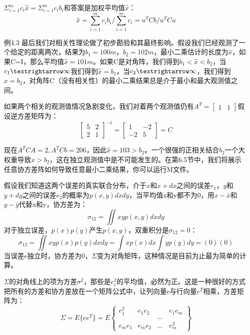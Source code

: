 	$\Sigma^{m}_{i=1}c_i\hat{x}=\Sigma^{m}_{i=1}c_ib_i$和答案是加权平均值$\hat{x}$：
	\begin{equation}
	\hat{x}=\sum_{i=1}^{m}c_ib_i / \sum_{i=1}^{m}c_i=u^TCb/u^TCu
	\end{equation}
	
	例4.3 \quad 最后我们对相关性理论做了初步勘验和其最终影响。假设我们已经观测了一个给定的距离两次，结果为$b_1=100m$，$b_2=102m$，最小二乘估计的长度为$\hat{x}$，如果C=I，那么平均值$\hat{x}=101m$。如果C是对角阵，我们得到$b_1<\hat{x}<b_2$，当$c_1\textrightarrow \infty $我们得到$\hat{x}=b_1$，当$c_2\textrightarrow \infty$，我们得到$\hat{x}=b_2$，对角阵C（没有相关性）的最小二乘结果总是介于最小和最大观测值之间。
	
	如果两个相关的观测值情况急剧变化，我们对着两个观测值仍有$A^T=\begin{bmatrix} 1 & 1\end{bmatrix}$假设逆方差矩阵为：
	\begin{equation*}
	\begin{bmatrix}
	5 & 2 \\ 2 & 1
	\end{bmatrix}^{-1}
	=
	\begin{bmatrix}
	1 & -2 \\ -2 & 5
	\end{bmatrix}
	=C
	\end{equation*}
	
	现在$A^TCA=2,A^TCb=206$，因此$\hat{x}=103>b_2$。一个很强的正相关结合$b_2$一个大权重导致$\hat{x}>b_2$，这在独立观测值中是不可能发生的。在第6.5节中，我们将展示任意协方差阵如何导致任意最小二乘结果，你可以运行M文件。
	
	假设我们知道这两个误差的真实联合分布，介于$x$和$x+dx$之间的误差$e_1$，$y$和$y+dy$之间的误差$e_2$的概率为$p(x,y)dxdy$，当平均值x和y都不为0，用$x-\bar{x}$和$y-\bar{y}$代替x和y，协方差为：
	\begin{equation}
	\sigma_12=\iint xyp(x,y)dxdy
	\end{equation}
	对于独立误差，$p(x)p(y)$产生$p(x,y)$，双重积分是$\sigma_12=0$：
	\begin{equation*}
	\sigma_12=\iint xyp(x)p(y)dxdy=\int xp(x)dx\int yp(y)dy=(0)(0)
	\end{equation*}
	当误差e独立时，协方差为0，$\Sigma$变为对角矩阵，这种情况是目前为止最为简单的计算。
	
	$\Sigma$的对角线上的项为方差$\sigma^2$，那些是$e^2_i$的平均值，必然为正。这是一种很好的方式把所有的方差和协方差放在一个矩阵公式中，让列向量e与行向量$e^T$相乘，方差矩阵为：
	\begin{equation}
	\Sigma=E\{ee^T\}=E
	\begin{Bmatrix}
	e^2_1 & e_1e_2 & \quad & e_1e_m \\
	\quad &\quad   & \dots & \quad  \\
	e_me_1&e_me_2  & \dots &e^2_m
	\end{Bmatrix}
	\end{equation}
	
